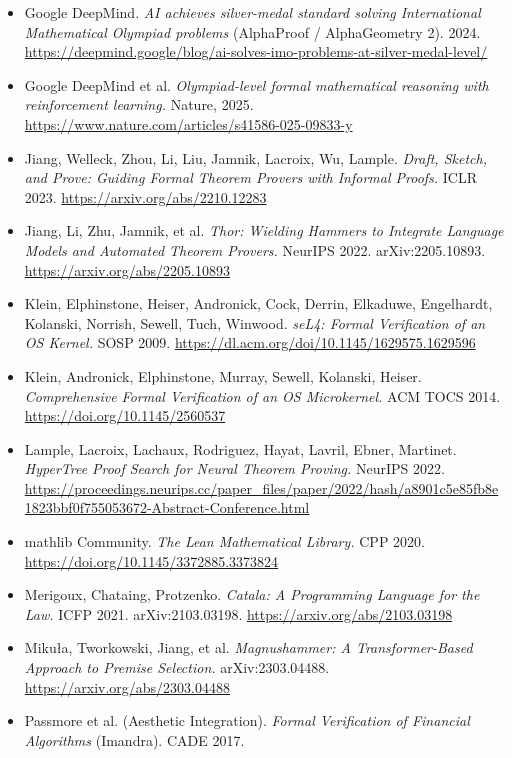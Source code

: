 \documentclass[
  11pt,
]{article}
\renewcommand{\_}{\origunderscore\allowbreak}
\begin{document}
\begin{itemize}
  \url{https://doi.org/10.1007/978-3-030-79876-5_37}
\item
  Google DeepMind. \emph{AI achieves silver-medal standard solving
  International Mathematical Olympiad problems} (AlphaProof /
  AlphaGeometry 2). 2024.
  \url{https://deepmind.google/blog/ai-solves-imo-problems-at-silver-medal-level/}
\item
  Google DeepMind et al. \emph{Olympiad-level formal mathematical
  reasoning with reinforcement learning.} Nature, 2025.
  \url{https://www.nature.com/articles/s41586-025-09833-y}
\item
  Jiang, Welleck, Zhou, Li, Liu, Jamnik, Lacroix, Wu, Lample.
  \emph{Draft, Sketch, and Prove: Guiding Formal Theorem Provers with
  Informal Proofs.} ICLR 2023. \url{https://arxiv.org/abs/2210.12283}
\item
  Jiang, Li, Zhu, Jamnik, et al. \emph{Thor: Wielding Hammers to
  Integrate Language Models and Automated Theorem Provers.} NeurIPS
  2022. arXiv:2205.10893. \url{https://arxiv.org/abs/2205.10893}
\item
  Klein, Elphinstone, Heiser, Andronick, Cock, Derrin, Elkaduwe,
  Engelhardt, Kolanski, Norrish, Sewell, Tuch, Winwood. \emph{seL4:
  Formal Verification of an OS Kernel.} SOSP 2009.
  \url{https://dl.acm.org/doi/10.1145/1629575.1629596}
\item
  Klein, Andronick, Elphinstone, Murray, Sewell, Kolanski, Heiser.
  \emph{Comprehensive Formal Verification of an OS Microkernel.} ACM
  TOCS 2014. \url{https://doi.org/10.1145/2560537}
\item
  Lample, Lacroix, Lachaux, Rodriguez, Hayat, Lavril, Ebner, Martinet.
  \emph{HyperTree Proof Search for Neural Theorem Proving.} NeurIPS
  2022.
  \url{https://proceedings.neurips.cc/paper_files/paper/2022/hash/a8901c5e85fb8e1823bbf0f755053672-Abstract-Conference.html}
\item
  mathlib Community. \emph{The Lean Mathematical Library.} CPP 2020.
  \url{https://doi.org/10.1145/3372885.3373824}
\item
  Merigoux, Chataing, Protzenko. \emph{Catala: A Programming Language
  for the Law.} ICFP 2021. arXiv:2103.03198.
  \url{https://arxiv.org/abs/2103.03198}
\item
  Mikuła, Tworkowski, Jiang, et al. \emph{Magnushammer: A
  Transformer-Based Approach to Premise Selection.} arXiv:2303.04488.
  \url{https://arxiv.org/abs/2303.04488}
\item
  Passmore et al. (Aesthetic Integration). \emph{Formal Verification of
  Financial Algorithms} (Imandra). CADE 2017.

\end{itemize}
\end{document}
